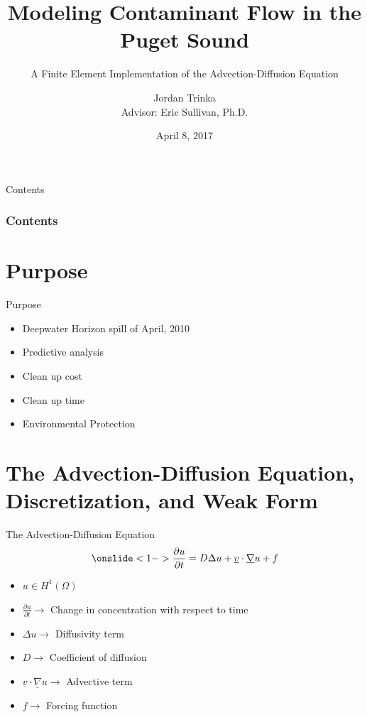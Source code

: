 \documentclass[10pt]{beamer}
\author{Jordan Trinka\\ Advisor: Eric Sullivan, Ph.D.}
\title[Short Title]{ Modeling Contaminant Flow in the \\Puget Sound}
\subtitle{A Finite Element Implementation of the Advection-Diffusion Equation} %
\date{April 8, 2017} %
\begin{document}
\begin{frame}[t,plain]
    \titlepage
\end{frame}

\begin{frame}{Contents}
\frametitle{Contents}
    \tableofcontents[
]
\end{frame}

\section{Purpose}

\begin{frame}{Purpose} \label{Purpose}
\begin{itemize}
\item<1-> Deepwater Horizon spill of April, 2010
\item<2-> Predictive analysis
\item<3-> Clean up cost
\item<4-> Clean up time
\item<5->Environmental Protection
\end{itemize}
\hyperlink{Questions}{}
\end{frame}

\section{The Advection-Diffusion Equation, Discretization, and Weak Form} 
\begin{frame}{The Advection-Diffusion Equation}\label{The Advection-Diffusion Equation}
\begin{equation}\onslide<1->
\frac{\partial u}{\partial t}= D\Delta u + \underline{v} \cdot \underline{\nabla}u+f
\end{equation}
\begin{itemize}
\item <2->$u \in  H^{1}\left(\Omega \right)$
\item <3->$\frac{\partial u}{\partial t} \rightarrow$ Change in concentration with respect to time
\item <4->$\Delta u \rightarrow$ Diffusivity term
\item <5->$D \rightarrow$ Coefficient of diffusion
\item<6->$\underline{v} \cdot \underline{\nabla}u \rightarrow$ Advective term
\item <7->$f \rightarrow$ Forcing function 
\end{itemize}
\hyperlink{Questions}{}
\end{frame}
\end{document}
